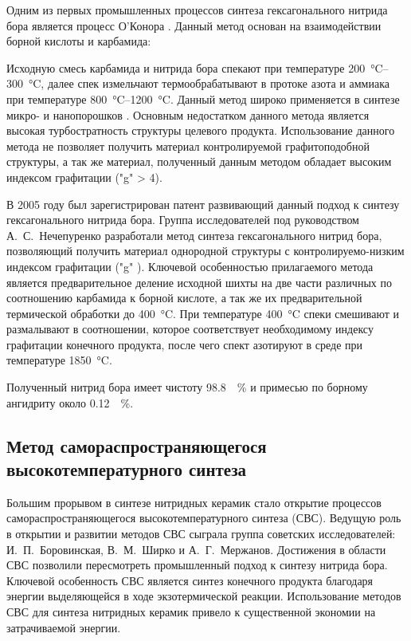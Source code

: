 Одним из первых промышленных процессов синтеза гексагонального нитрида бора является
процесс О'Конора \cite[]{edmond_process_1966}. Данный метод основан на взаимодействии 
борной кислоты и карбамида:


Исходную смесь карбамида и нитрида бора спекают при температуре 
\SIrange{200}{300}{\degreeCelsius}, далее спек измельчают термообрабатывают в протоке 
азота и аммиака при температуре \SIrange{800}{1200}{\degreeCelsius}. Данный метод
широко применяется в синтезе микро- и нанопорошков . Основным недостатком
данного метода является высокая турбостратность структуры целевого продукта.
Использование данного метода не позволяет получить материал контролируемой 
графитоподобной структуры, а так же материал, полученный данным методом 
обладает высоким индексом графитации ("g" > 4).  


В 2005 году был зарегистрирован патент \cite[]{_ru__2005} развивающий данный 
подход к синтезу гексагонального нитрида бора. Группа исследователей под
руководством А.~С.~Нечепуренко разработали метод синтеза гексагонального нитрид
бора, позволяющий получить материал однородной структуры с контролируемо-низким
индексом графитации ("g" ). Ключевой особенностью прилагаемого метода
является предварительное деление исходной шихты  на две части 
различных по соотношению карбамида к борной кислоте, а так же их предварительной
термической обработки до \SI{400}{\degreeCelsius}. При температуре \SI{400}{\degreeCelsius}
спеки смешивают и размалывают в соотношении, которое соответствует необходимому 
индексу графитации конечного продукта, после чего спект азотируют в среде 
при температуре \SI{1850}{\degreeCelsius}.

Полученный нитрид бора имеет чистоту \SI{98.8}{\%} и примесью по 
борному ангидриту около \SI{0.12}{\%}.

\subsection{Метод самораспространяющегося высокотемпературного синтеза}%
\label{sub:Метод самораспространяющегося высокотемпературного синтеза}

Большим прорывом в синтезе нитридных керамик стало открытие процессов
самораспространяющегося высокотемпературного синтеза (СВС). Ведущую роль
в открытии и развитии методов СВС сыграла группа советских
исследователей: И.~П.~Боровинская, В.~М.~Ширко и А.~Г.~Мержанов. Достижения
в области СВС позволили пересмотреть промышленный подход к синтезу нитрида
бора. Ключевой особенность СВС является синтез конечного продукта благодаря
энергии выделяющейся в ходе экзотермической реакции. Использование методов 
СВС для синтеза нитридных керамик привело к существенной экономии на затрачиваемой
энергии.

